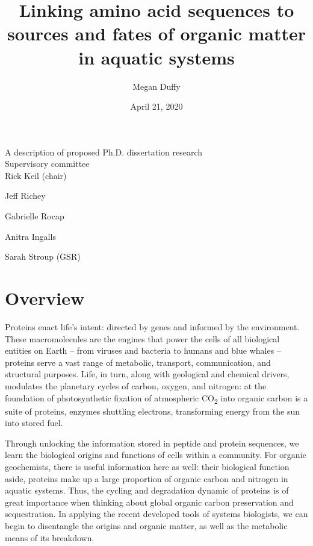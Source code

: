 \documentclass[12pt, letterpaper, twoside]{article}
\title{Linking amino acid sequences to sources and fates of organic matter in aquatic systems}
\author{Megan Duffy}
\date{April 21, 2020}
\begin{document}
	
	\begin{titlepage}
		
		\maketitle
		\begin{center}
			A description of proposed Ph.D. dissertation research \\
			\bigskip
			\bigskip
			Supervisory committee \\
			\bigskip
			Rick Keil (chair) 
			
			Jeff Richey 
			
			Gabrielle Rocap 
			
			Anitra Ingalls 
			
			Sarah Stroup (GSR)
		\end{center}
		
	\end{titlepage}
	

\newpage

\tableofcontents{}

\newpage

\section*{Overview}

Proteins enact life’s intent: directed by genes and informed by the environment. These macromolecules are the engines that power the cells of all biological entities on Earth – from viruses and bacteria to humans and blue whales – proteins serve a vast range of metabolic, transport, communication, and structural purposes. Life, in turn, along with geological and chemical drivers, modulates the planetary cycles of carbon, oxygen, and nitrogen: at the foundation of photosynthetic fixation of atmospheric CO\textsubscript{2} into organic carbon is a suite of proteins, enzymes shuttling electrons, transforming energy from the sun into stored fuel. 

Through unlocking the information stored in peptide and protein sequences, we learn the biological origins and functions of cells within a community. For organic geochemists, there is useful information here as well: their biological function aside, proteins make up a large proportion of organic carbon and nitrogen in aquatic systems. Thus, the cycling and degradation dynamic of proteins is of great importance when thinking about global organic carbon preservation and sequestration. In applying the recent developed tools of systems biologists, we can begin to disentangle the origins and organic matter, as well as the metabolic means of its breakdown.
\end{document}
